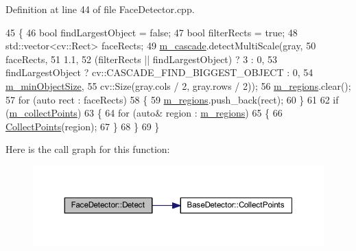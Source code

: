 Definition at line 44 of file Face\+Detector.\+cpp.


\begin{DoxyCode}
45 \{
46     \textcolor{keywordtype}{bool} findLargestObject = \textcolor{keyword}{false};
47     \textcolor{keywordtype}{bool} filterRects = \textcolor{keyword}{true};
48     std::vector<cv::Rect> faceRects;
49     \mbox{\hyperlink{class_face_detector_ad1d3ea259a43c8806bc658273024929a}{m\_cascade}}.detectMultiScale(gray,
50                              faceRects,
51                              1.1,
52                              (filterRects || findLargestObject) ? 3 : 0,
53                              findLargestObject ? cv::CASCADE\_FIND\_BIGGEST\_OBJECT : 0,
54                              \mbox{\hyperlink{class_base_detector_a651b938c89c94daac4763728637d90c9}{m\_minObjectSize}},
55                              cv::Size(gray.cols / 2, gray.rows / 2));
56     \mbox{\hyperlink{class_base_detector_a409c20093acba261db8354ca72058fce}{m\_regions}}.clear();
57     \textcolor{keywordflow}{for} (\textcolor{keyword}{auto} rect : faceRects)
58     \{
59         \mbox{\hyperlink{class_base_detector_a409c20093acba261db8354ca72058fce}{m\_regions}}.push\_back(rect);
60     \}
61 
62     \textcolor{keywordflow}{if} (\mbox{\hyperlink{class_base_detector_a403cbf784fcb960bdb7d080c86c4a2ea}{m\_collectPoints}})
63     \{
64         \textcolor{keywordflow}{for} (\textcolor{keyword}{auto}& region : \mbox{\hyperlink{class_base_detector_a409c20093acba261db8354ca72058fce}{m\_regions}})
65         \{
66             \mbox{\hyperlink{class_base_detector_a20380b0980c6f262b0829f37fb89d2a7}{CollectPoints}}(region);
67         \}
68     \}
69 \}
\end{DoxyCode}
Here is the call graph for this function\+:\nopagebreak
\begin{figure}[H]
\begin{center}
\leavevmode
\includegraphics[width=350pt]{class_face_detector_a4b9210a00283d5bf394c6188e3e0ab39_cgraph}
\end{center}
\end{figure}
\mbox{\label{class_base_detector_a52ac4b2feed15a47de84a69eb45c233f}} 
